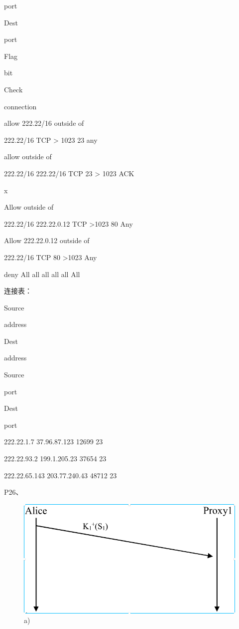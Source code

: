 \documentclass[11pt,UTF8,twoside]{article}
\begin{document}
{	port 

	Dest 

	port 

	Flag 

	bit 

	Check 

	connection

	allow 222.22/16 outside of 

	222.22/16 TCP > 1023 23 any 

	allow outside of 

	222.22/16 222.22/16 TCP 23 > 1023 ACK 

	x 

	Allow outside of 

	222.22/16 222.22.0.12 TCP >1023 80 Any 

	Allow 222.22.0.12 outside of 

	222.22/16 TCP 80 >1023 Any 

	deny All all all all all All 

	
	连接表：
	
	Source 

	address 

	Dest 

	address 

	Source 

	port 

	Dest 

	port 

	222.22.1.7 37.96.87.123 12699 23 

	222.22.93.2 199.1.205.23 37654 23 

	222.22.65.143 203.77.240.43 48712 23 
	
	P26、
	\begin{figure}

	\centering

	\includegraphics[width=.8\textwidth]{./img/37.png} %

	\caption{a)} %


\end{figure}}
\end{document}
